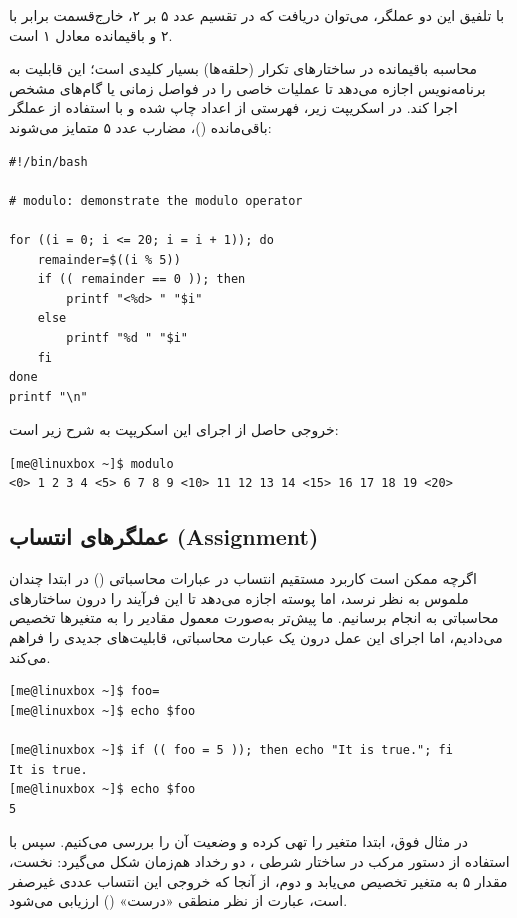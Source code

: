 با تلفیق این دو عملگر، می‌توان دریافت که در تقسیم عدد ۵ بر ۲، خارج‌قسمت برابر با ۲ و باقیمانده معادل ۱ است.

محاسبه باقیمانده در ساختارهای تکرار (حلقه‌ها) بسیار کلیدی است؛ این قابلیت به برنامه‌نویس اجازه می‌دهد تا عملیات خاصی را در فواصل زمانی یا گام‌های مشخص اجرا کند. در اسکریپت زیر، فهرستی از اعداد چاپ شده و با استفاده از عملگر باقی‌مانده ()، مضارب عدد ۵ متمایز می‌شوند:

\begin{latin}
\begin{lstlisting}
#!/bin/bash

# modulo: demonstrate the modulo operator

for ((i = 0; i <= 20; i = i + 1)); do
    remainder=$((i % 5))
    if (( remainder == 0 )); then
        printf "<%d> " "$i"
    else
        printf "%d " "$i"
    fi
done
printf "\n"
\end{lstlisting}
\end{latin}

خروجی حاصل از اجرای این اسکریپت به شرح زیر است:

\begin{latin}
\begin{lstlisting}
[me@linuxbox ~]$ modulo
<0> 1 2 3 4 <5> 6 7 8 9 <10> 11 12 13 14 <15> 16 17 18 19 <20>
\end{lstlisting}
\end{latin}

\subsection{عملگرهای انتساب (Assignment)}

اگرچه ممکن است کاربرد مستقیم انتساب در عبارات محاسباتی () در ابتدا چندان ملموس به نظر نرسد، اما پوسته  اجازه می‌دهد تا این فرآیند را درون ساختارهای محاسباتی به انجام برسانیم. ما پیش‌تر به‌صورت معمول مقادیر را به متغیرها تخصیص می‌دادیم، اما اجرای این عمل درون یک عبارت محاسباتی، قابلیت‌های جدیدی را فراهم می‌کند.

\begin{latin}
\begin{lstlisting}
[me@linuxbox ~]$ foo=
[me@linuxbox ~]$ echo $foo

[me@linuxbox ~]$ if (( foo = 5 )); then echo "It is true."; fi
It is true.
[me@linuxbox ~]$ echo $foo
5
\end{lstlisting}
\end{latin}

در مثال فوق، ابتدا متغیر  را تهی کرده و وضعیت آن را بررسی می‌کنیم. سپس با استفاده از دستور مرکب  در ساختار شرطی ، دو رخداد هم‌زمان شکل می‌گیرد: نخست، مقدار ۵ به متغیر  تخصیص می‌یابد و دوم، از آنجا که خروجی این انتساب عددی غیرصفر است، عبارت از نظر منطقی «درست» () ارزیابی می‌شود.

